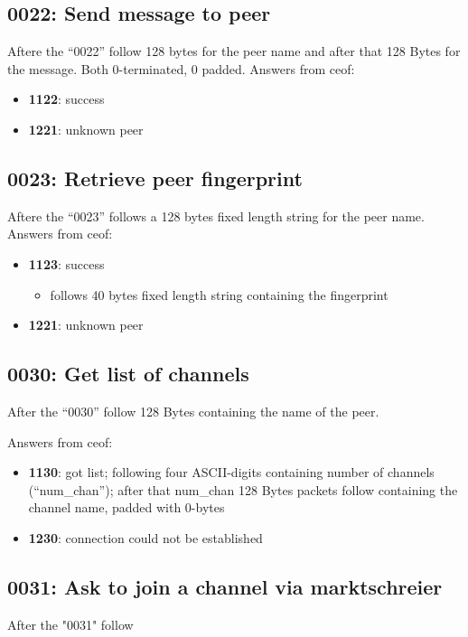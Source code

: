 \documentclass[12pt,a4paper]{book}
\begin{document}
\subsection{0022: Send message to peer}
Aftere the "`0022"' follow 128 bytes for the peer name
and after that 128 Bytes for the message.
Both 0-terminated, 0 padded.
Answers from ceof:
\begin{itemize}
\item \textbf{1122}: success
\item \textbf{1221}: unknown peer
\end{itemize}
\subsection{0023: Retrieve peer fingerprint}
Aftere the "`0023"' follows a 128 bytes fixed length string for the peer name.
Answers from ceof:
\begin{itemize}
\item \textbf{1123}: success
\begin{itemize}
\item follows 40 bytes fixed length string containing the fingerprint
\end{itemize}
\item \textbf{1221}: unknown peer
\end{itemize}
\subsection{0030: Get list of channels}
After the "`0030"' follow 128 Bytes containing the 
name of the peer.

Answers from ceof:

\begin{itemize}
\item \textbf{1130}: got list; following four ASCII-digits containing
number of channels ("`num\_chan"'); after that  num\_chan 128 Bytes packets
follow containing the channel name, padded with 0-bytes
\item \textbf{1230}: connection could not be established
\end{itemize}
\subsection{0031: Ask to join a channel via marktschreier}
After the "0031" follow
\end{document}
